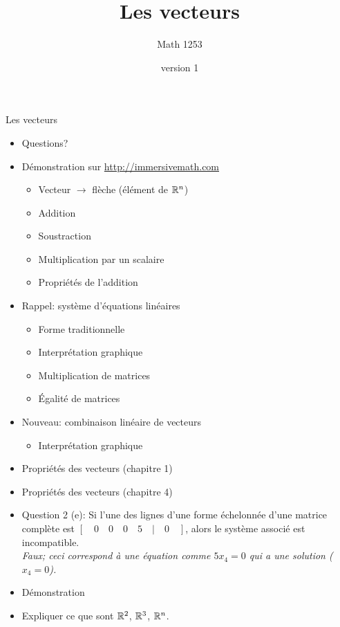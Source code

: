 \documentclass[french, handout]{beamer}
\title{Les vecteurs}
\author{Math 1253} %
\date{version 1}   %
\begin{document}
	\frame{\titlepage}
	
	\begin{frame}{Les vecteurs}
	\begin{itemize}
	\item Questions?
	\item Démonstration sur \url{http://immersivemath.com}
	\begin{itemize}
	    \item Vecteur $\rightarrow$ flèche (élément de $\mathbb{R}^n$)
	    \item Addition
	    \item Soustraction
	    \item Multiplication par un scalaire
	    \item Propriétés de l'addition
	\end{itemize}
	\item Rappel: système d'équations linéaires
	\begin{itemize}
	    \item Forme traditionnelle
	    \item Interprétation graphique
	    \item Multiplication de matrices
	    \item Égalité de matrices
	\end{itemize}
	\item Nouveau: {\color{red}combinaison linéaire de vecteurs}
	\begin{itemize}
	    \item Interprétation graphique
	\end{itemize}
	\item Propriétés des vecteurs (chapitre 1)
	\item Propriétés des vecteurs (chapitre 4)
	\end{itemize}
\end{frame}	

\begin{frame}

\begin{itemize}
\item Question 2 (e): Si l'une des lignes d'une forme échelonnée d'une matrice complète est 
	$[\quad 0\quad 0\quad 0\quad 5\quad |\quad 0\quad ]$, alors le système associé est incompatible.\\ 
		\textit{\color{blue} Faux; ceci correspond à une équation comme $5x_4 = 0$ qui a une solution ($x_4=0$).}
\item Démonstration
\item Expliquer ce que sont $\mathbb{R}^2$, $\mathbb{R}^3$, $\mathbb{R}^n$.
\end{itemize}



\end{frame}
	
\end{document}
